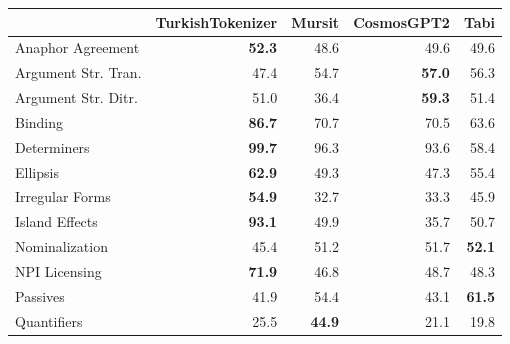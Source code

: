 \begin{tabular}{lrrrr}
\toprule
 & TurkishTokenizer & Mursit & CosmosGPT2 & Tabi \\
\midrule
Anaphor Agreement & \cellcolor[RGB]{243,202,95} \textbf{52.3} & \cellcolor[RGB]{255,194,97} 48.6 & \cellcolor[RGB]{255,198,99} 49.6 & \cellcolor[RGB]{255,198,99} 49.6 \\
Argument Str. Tran. & \cellcolor[RGB]{255,189,94} 47.4 & \cellcolor[RGB]{231,205,90} 54.7 & \cellcolor[RGB]{219,207,86} \textbf{57.0} & \cellcolor[RGB]{222,206,87} 56.3 \\
Argument Str. Ditr. & \cellcolor[RGB]{249,201,98} 51.0 & \cellcolor[RGB]{255,145,72} 36.4 & \cellcolor[RGB]{207,210,81} \textbf{59.3} & \cellcolor[RGB]{247,201,97} 51.4 \\
Binding & \cellcolor[RGB]{67,240,26} \textbf{86.7} & \cellcolor[RGB]{149,222,58} 70.7 & \cellcolor[RGB]{150,222,59} 70.5 & \cellcolor[RGB]{185,214,72} 63.6 \\
Determiners & \cellcolor[RGB]{1,254,0} \textbf{99.7} & \cellcolor[RGB]{18,250,7} 96.3 & \cellcolor[RGB]{32,247,12} 93.6 & \cellcolor[RGB]{212,209,83} 58.4 \\
Ellipsis & \cellcolor[RGB]{189,214,74} \textbf{62.9} & \cellcolor[RGB]{255,197,98} 49.3 & \cellcolor[RGB]{255,189,94} 47.3 & \cellcolor[RGB]{227,205,89} 55.4 \\
Irregular Forms & \cellcolor[RGB]{230,205,90} \textbf{54.9} & \cellcolor[RGB]{255,130,65} 32.7 & \cellcolor[RGB]{255,133,66} 33.3 & \cellcolor[RGB]{255,183,91} 45.9 \\
Island Effects & \cellcolor[RGB]{35,247,13} \textbf{93.1} & \cellcolor[RGB]{255,199,99} 49.9 & \cellcolor[RGB]{255,142,71} 35.7 & \cellcolor[RGB]{251,200,98} 50.7 \\
Nominalization & \cellcolor[RGB]{255,181,90} 45.4 & \cellcolor[RGB]{248,201,97} 51.2 & \cellcolor[RGB]{246,201,96} 51.7 & \cellcolor[RGB]{244,202,95} \textbf{52.1} \\
NPI Licensing & \cellcolor[RGB]{143,224,56} \textbf{71.9} & \cellcolor[RGB]{255,187,93} 46.8 & \cellcolor[RGB]{255,194,97} 48.7 & \cellcolor[RGB]{255,193,96} 48.3 \\
Passives & \cellcolor[RGB]{255,167,83} 41.9 & \cellcolor[RGB]{232,204,91} 54.4 & \cellcolor[RGB]{255,172,86} 43.1 & \cellcolor[RGB]{196,212,77} \textbf{61.5} \\
Quantifiers & \cellcolor[RGB]{255,102,51} 25.5 & \cellcolor[RGB]{255,179,89} \textbf{44.9} & \cellcolor[RGB]{255,84,42} 21.1 & \cellcolor[RGB]{255,79,39} 19.8 \\

\end{tabular}

